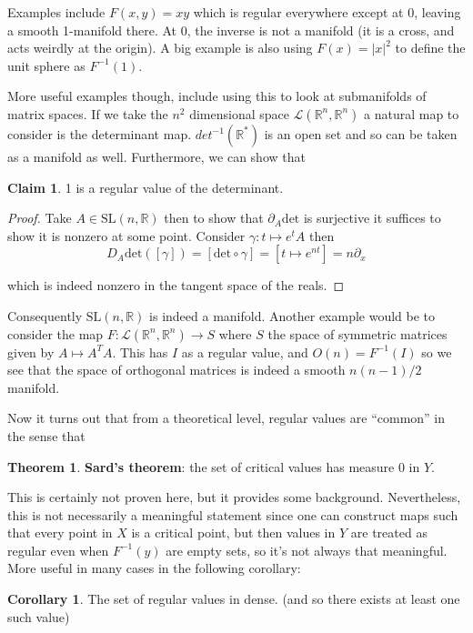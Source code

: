 \documentclass{article}
\theoremstyle{definition}
\newtheorem{theorem}{Theorem}
\newtheorem{corollary}{Corollary}
\newtheorem{claim}{Claim}
\begin{document}
Examples include $F(x, y) = xy$ which is regular everywhere except at 0, leaving
a smooth 1-manifold there. At 0, the inverse is not a manifold (it is a cross,
and acts weirdly at the origin). A big example is also using $F(x) = |x|^2$ to
define the unit sphere as $F^{-1}(1)$.

More useful examples though, include using this to look at submanifolds of
matrix spaces. If we take the $n^2$ dimensional space $\mathcal{L}(\mathbb{R}^n,
\mathbb{R}^n)$ a natural map to consider is the determinant map.
$det^{-1}(\mathbb{R}^*)$ is an open set and so can be taken as a manifold as
well. Furthermore, we can show that

\begin{claim}
1 is a regular value of the determinant.
\end{claim}
\begin{proof}
Take $A \in \text{SL}(n, \mathbb{R})$ then to show that $\partial_A \text{det}$
is surjective it suffices to show it is nonzero at some point. Consider $\gamma
: t \mapsto e^{t} A$ then
$$ D_A\text{det}([\gamma]) = [\text{det} \circ \gamma] = [t \mapsto e^{nt}] = n
\partial_x $$ 

which is indeed nonzero in the tangent space of the reals.
\end{proof}

Consequently $\text{SL}(n, \mathbb{R})$ is indeed a manifold. Another example
would be to consider the map $F : \mathcal{L}(\mathbb{R}^n, \mathbb{R}^n) \to S$
where $S$ the space of symmetric matrices given by $A \mapsto A^T A$. This has
$I$ as a regular value, and $O(n) = F^{-1}(I)$ so we see that the space of
orthogonal matrices is indeed a smooth $n(n - 1) / 2$ manifold.

Now it turns out that from a theoretical level, regular values are ``common'' in
the sense that

\begin{theorem}
\textbf{Sard's theorem}: the set of critical values has measure 0 in $Y$.
\end{theorem}

This is certainly not proven here, but it provides some background.
Nevertheless, this is not necessarily a meaningful statement since one can
construct maps such that every point in $X$ is a critical point, but then values
in $Y$ are treated as regular even when $F^{-1}(y)$ are empty sets, so it's not
always that meaningful. More useful in many cases in the following corollary:

\begin{corollary}
The set of regular values in dense. (and so there exists at least one such value)
\end{corollary}
\end{document}
